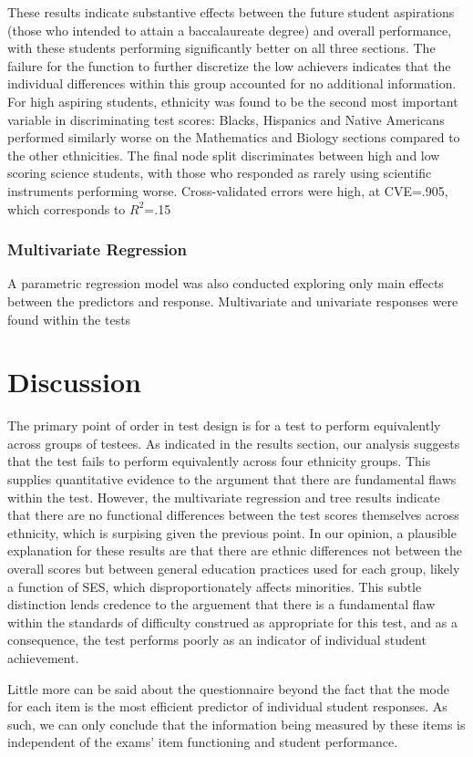 \documentclass{article}\usepackage[]{graphicx}\usepackage[]{color}
\begin{document}
These results indicate substantive effects between the future student aspirations (those who intended to attain a baccalaureate degree) and overall performance, with these students performing significantly better on all three sections. The failure for the function to further discretize the low achievers indicates that the individual differences within this group accounted for no additional information. For high aspiring students, ethnicity was found to be the second most important variable in discriminating test scores: Blacks, Hispanics and Native Americans performed similarly worse on the Mathematics and Biology sections compared to the other ethnicities. The final node split discriminates between high and low scoring science students, with those who responded as rarely using scientific instruments performing worse. Cross-validated errors were high, at CVE=.905, which corresponds to $R^2$=.15

\subsubsection{Multivariate Regression}
A parametric regression model was also conducted exploring only main effects between the predictors and response. Multivariate and univariate responses were found within the tests


\section{Discussion}

The primary point of order in test design is for a test to perform equivalently across groups of testees. As indicated in the results section, our analysis suggests that the test fails to perform equivalently across four ethnicity groups. This supplies quantitative evidence to the argument that there are fundamental flaws within the test. However, the multivariate regression and tree results indicate that there are no functional differences between the test scores themselves across ethnicity, which is surpising given the previous point. In our opinion, a plausible explanation for these results are that there are ethnic differences not between the overall scores but between general education practices used for each group, likely a function of SES, which disproportionately affects minorities. This subtle distinction lends credence to the arguement that there is a fundamental flaw within the standards of difficulty construed as appropriate for this test, and as a consequence, the test performs poorly as an indicator of individual student achievement.

Little more can be said about the questionnaire beyond the fact that the mode for each item is the most efficient predictor of individual student responses. As such, we can only conclude that the information being measured by these items is independent of the exams' item functioning and student performance.


{}

\end{document}
